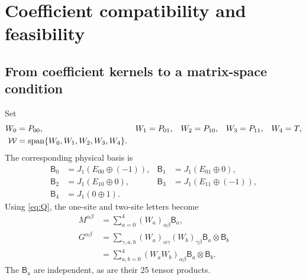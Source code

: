 \section{Coefficient compatibility and feasibility}
\label{sec:compatibility}

\subsection{From coefficient kernels to a matrix-space condition}

Set
\begin{align}
	W_0   & =P_{00},                                     &
	W_1   & =P_{01},                                     &
	W_2   & =P_{10},                                     &
	W_3   & =P_{11},                                     &
	W_4   & =T,
	\nonumber                                              \\
	\mathcal{W} & =\operatorname{span}\{W_0,W_1,W_2,W_3,W_4\}.
	\label{eq:W}
\end{align}
The corresponding physical basis is
\begin{align}
	\mathsf B_0 & =J_1(E_{00}\oplus(-1)),
	            &
	\mathsf B_1 & =J_1(E_{01}\oplus0),
	\nonumber                             \\
	\mathsf B_2 & =J_1(E_{10}\oplus0),
	            &
	\mathsf B_3 & =J_1(E_{11}\oplus(-1)),
	\nonumber                             \\
	\mathsf B_4 & =J_1(0\oplus1).
	\label{eq:B}
\end{align}
Using \cref{eq:Q}, the one-site and two-site letters become
\begin{align}
	M^{\alpha\beta}
	 & =\sum_{a=0}^4(W_a)_{\alpha\beta}\mathsf B_a,
	\nonumber                                                                 \\
	G^{\alpha\beta}
	 & =\sum_{\gamma,a,b}
	    (W_a)_{\alpha\gamma}(W_b)_{\gamma\beta}\mathsf B_a\otimes \mathsf B_b
	\nonumber                                                                 \\
	 & =\sum_{a,b=0}^4(W_aW_b)_{\alpha\beta}\mathsf B_a\otimes \mathsf B_b.
	\label{eq:blocked-coordinates}
\end{align}
The $\mathsf B_a$ are independent, as are their 25 tensor products.

